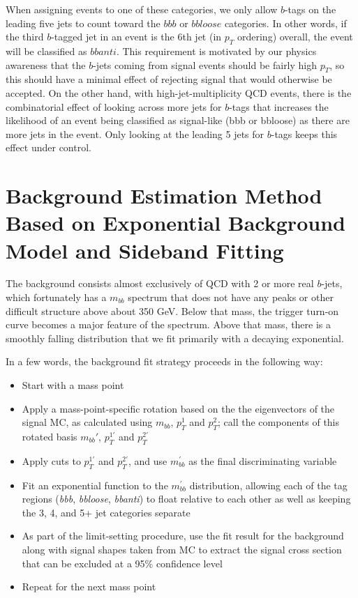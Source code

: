 When assigning events to one of these categories, we only allow $b$-tags on the leading
five jets to count toward the $bbb$ or $bbloose$ categories.  In other words, if the third
$b$-tagged jet in an event is the 6th jet (in $p_T$ ordering) overall, the event 
will be classified as $bbanti$.  This requirement is motivated by our physics awareness that
the $b$-jets coming from signal events should be fairly high $p_T$, so this should have
a minimal effect of rejecting signal that would otherwise be accepted.  On the other
hand, with high-jet-multiplicity QCD events, there is the combinatorial effect of looking across
more jets for $b$-tags that increases the likelihood of an event being classified as signal-like
(bbb or bbloose) as there are more jets in the event.  Only looking at the leading 5 jets
for $b$-tags keeps this effect under control. 


\section{Background Estimation Method Based on Exponential Background Model and Sideband Fitting}
The background consists almost exclusively of QCD with 2 or more real $b$-jets, which 
fortunately has a $m_{bb}$ spectrum that does not have any peaks or other difficult
structure above about 350 GeV.  Below that mass, the trigger turn-on curve becomes
a major feature of the spectrum.  Above that mass, there
is a smoothly falling distribution that we fit primarily with a decaying exponential.

In a few words, the background fit strategy proceeds in the following way:
\begin{itemize}
    \item Start with a mass point
    \item Apply a mass-point-specific rotation based on the the eigenvectors of 
    the signal MC, as calculated using $m_{bb}$, $p_{T}^1$ and $p_T^2$; call 
    the components of this rotated basis $m_{bb}'$, $p_T^{1'}$ and $p_T^{2'}$
    \item Apply cuts to $p_T^{1'}$ and $p_T^{2'}$, and use $m_{bb}^{'}$ as the final 
    discriminating variable 
    \item Fit an exponential function to the $m_{bb}^{'}$ distribution, allowing each of the 
tag regions (\textit{bbb}, \textit{bbloose}, \textit{bbanti}) to float relative to each other
 as well as keeping the 3, 4, and 5+ jet categories separate
    \item As part of the limit-setting procedure, use the fit result for the 
    background along with signal shapes taken from MC to extract the 
signal cross section that can be excluded at a 95\% confidence level
    \item Repeat for the next mass point
\end{itemize}

